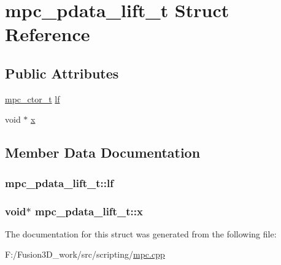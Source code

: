 \hypertarget{structmpc__pdata__lift__t}{}\section{mpc\+\_\+pdata\+\_\+lift\+\_\+t Struct Reference}
\label{structmpc__pdata__lift__t}
\subsection*{Public Attributes}
\begin{DoxyCompactItemize}
\item 
\hyperlink{mpc_8h_adfa0bdc52cd524f253094dc148c4a913}{mpc\+\_\+ctor\+\_\+t} \hyperlink{structmpc__pdata__lift__t_a55b35a19a3ff44cb912d1261757915e6}{lf}
\item 
void $\ast$ \hyperlink{structmpc__pdata__lift__t_a02e9b62f8c71f2dbcfa314347b49c7ed}{x}
\end{DoxyCompactItemize}


\subsection{Member Data Documentation}
\hypertarget{structmpc__pdata__lift__t_a55b35a19a3ff44cb912d1261757915e6}{}
\subsubsection[{lf}]{ mpc\+\_\+pdata\+\_\+lift\+\_\+t\+::lf}\label{structmpc__pdata__lift__t_a55b35a19a3ff44cb912d1261757915e6}
\hypertarget{structmpc__pdata__lift__t_a02e9b62f8c71f2dbcfa314347b49c7ed}{}
\subsubsection[{x}]{\setlength{\rightskip}{0pt plus 5cm}void$\ast$ mpc\+\_\+pdata\+\_\+lift\+\_\+t\+::x}\label{structmpc__pdata__lift__t_a02e9b62f8c71f2dbcfa314347b49c7ed}


The documentation for this struct was generated from the following file\+:\begin{DoxyCompactItemize}
\item 
F\+:/\+Fusion3\+D\+\_\+work/src/scripting/\hyperlink{mpc_8cpp}{mpc.\+cpp}\end{DoxyCompactItemize}
